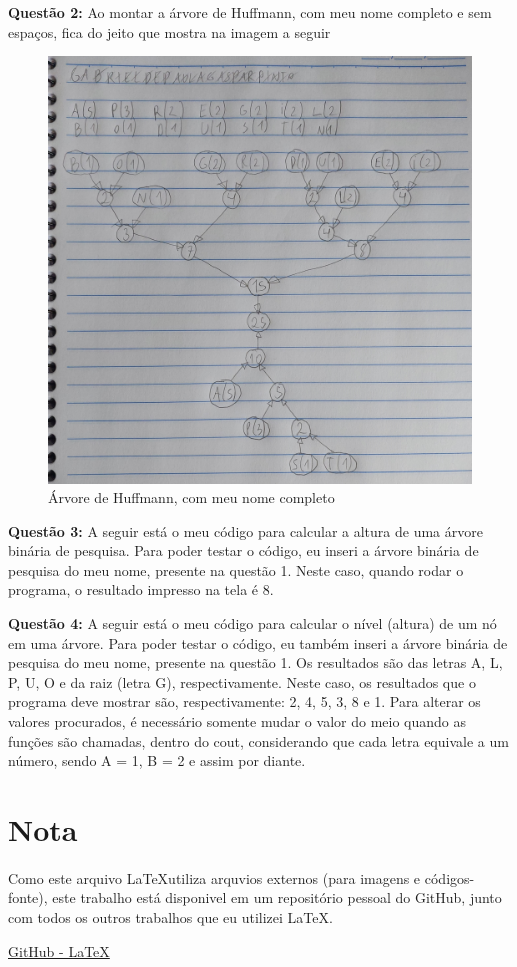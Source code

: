 \documentclass{article}
\begin{document}
\newpage
\textbf{Questão 2:}
Ao montar a árvore de Huffmann, com meu nome completo e sem espaços, fica do jeito que mostra na imagem a seguir

\begin{figure}[h!]
    \centering
    \includegraphics[width=0.5\linewidth]{huffmann.jpg}
    \caption{Árvore de Huffmann, com meu nome completo}
    \label{fig:questao1}
\end{figure}

\textbf{Questão 3:}
A seguir está o meu código para calcular a altura de uma árvore binária de pesquisa. Para poder testar o código, eu inseri a árvore binária de pesquisa do meu nome, presente na questão 1. Neste caso, quando rodar o programa, o resultado impresso na tela é 8.



\newpage
\textbf{Questão 4:}
A seguir está o meu código para calcular o nível (altura) de um nó em uma árvore. Para poder testar o código, eu também inseri a árvore binária de pesquisa do meu nome, presente na questão 1. Os resultados são das letras A, L, P, U, O e da raiz (letra G), respectivamente. Neste caso, os resultados que o programa deve mostrar são, respectivamente: 2, 4, 5, 3, 8 e 1. Para alterar os valores procurados, é necessário somente mudar o valor do meio quando as funções são chamadas, dentro do cout, considerando que cada letra equivale a um número, sendo A = 1, B = 2 e assim por diante.



\section{Nota}
\paragraph{}Como este arquivo \LaTeX  \hspace{1mm}utiliza arquvios externos (para imagens e códigos-fonte), este trabalho está disponivel em um repositório pessoal do GitHub, junto com todos os outros trabalhos que eu utilizei \LaTeX.

\begin{center}
    \href{https://github.com/gpgp2006/LaTeX}{GitHub - \LaTeX}

    
\end{center}
\end{document}
